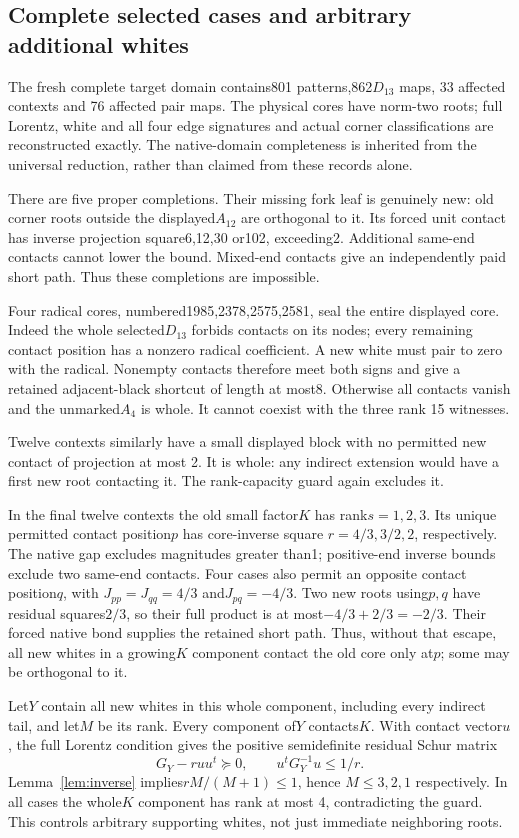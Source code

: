 \documentclass[11pt]{article}
\theoremstyle{remark}\newtheorem{remark}[theorem]{Remark}
\begin{document}
\subsection{Complete selected cases and arbitrary additional whites}
The fresh complete target domain contains801 patterns,862$D_{13}$ maps,
33 affected contexts and 76 affected pair maps. The physical cores have
norm-two roots; full Lorentz, white and all four edge signatures and actual
corner classifications are reconstructed exactly. The native-domain
completeness is inherited from the universal reduction, rather than
claimed from these records alone.

There are five proper completions. Their missing fork leaf is genuinely
new: old corner roots outside the displayed$A_{12}$ are orthogonal to it.
Its forced unit contact has inverse projection square6,12,30 or102,
exceeding2. Additional same-end contacts cannot lower the bound. Mixed-end
contacts give an independently paid short path. Thus these completions
are impossible.

Four radical cores, numbered1985,2378,2575,2581, seal the entire displayed
core. Indeed the whole selected$D_{13}$ forbids contacts on its nodes;
every remaining contact position has a nonzero radical coefficient. A new
white must pair to zero with the radical. Nonempty contacts therefore
meet both signs and give a retained adjacent-black shortcut of length at
most8. Otherwise all contacts vanish and the unmarked$A_4$ is whole.
It cannot coexist with the three rank 15 witnesses.

Twelve contexts similarly have a small displayed block with no permitted
new contact of projection at most 2. It is whole: any indirect extension
would have a first new root contacting it. The rank-capacity guard again
excludes it.

In the final twelve contexts the old small factor$K$ has rank$s=1,2,3$.
Its unique permitted contact position$p$ has core-inverse square
$r=4/3,3/2,2$, respectively. The native gap excludes magnitudes greater
than1; positive-end inverse bounds exclude two same-end contacts.
Four cases also permit an opposite contact position$q$, with
$J_{pp}=J_{qq}=4/3$ and$J_{pq}=-4/3$. Two new roots using$p,q$ have residual
squares$2/3$, so their full product is at most$-4/3+2/3=-2/3$. Their
forced native bond supplies the retained short path. Thus, without that
escape, all new whites in a growing$K$ component contact the old core
only at$p$; some may be orthogonal to it.

Let$Y$ contain all new whites in this whole component, including every
indirect tail, and let$M$ be its rank. Every component of$Y$ contacts$K$.
With contact vector$u$, the full Lorentz condition gives the positive
semidefinite residual Schur matrix
\[
 G_Y-r uu^t\succeq0,
 \qquad u^tG_Y^{-1}u\le1/r.
\]
Lemma~\ref{lem:inverse} implies$rM/(M+1)\le1$, hence
$M\le3,2,1$ respectively. In all cases the whole$K$ component has rank
at most 4, contradicting the guard. This controls arbitrary supporting
whites, not just immediate neighboring roots.
\end{document}
